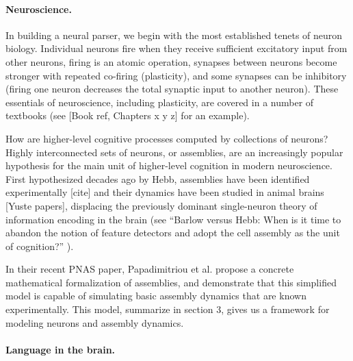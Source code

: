 \paragraph{Neuroscience.} In building a neural parser, we begin with the most established tenets of neuron biology. Individual neurons fire when they receive sufficient excitatory input from other neurons, firing is an atomic operation, synapses between neurons become stronger with repeated co-firing (plasticity), and some synapses can be inhibitory (firing one neuron decreases the total synaptic input to another neuron). These essentials of neuroscience, including plasticity, are covered in a number of textbooks (see [Book ref, Chapters x y z] for an example). 

How are higher-level cognitive processes computed by collections of neurons? Highly interconnected sets of neurons, or assemblies, are an increasingly popular hypothesis for the main unit of higher-level cognition in modern neuroscience. First hypothesized decades ago by Hebb, assemblies have been identified experimentally [cite] and their dynamics have been studied in animal brains [Yuste papers], displacing the previously dominant single-neuron theory of information encoding in the brain (see 
“Barlow versus Hebb: When is it time to abandon the notion of feature detectors and adopt the cell assembly as the unit of cognition?” \cite{eichenbaum}). 

In their recent PNAS paper, Papadimitriou et al. propose a concrete mathematical formalization of assemblies, and demonstrate that this simplified model is capable of simulating basic assembly dynamics that are known experimentally. This model, summarize in section 3, gives us a framework for modeling neurons and assembly dynamics.

\paragraph{Language in the brain.} 


